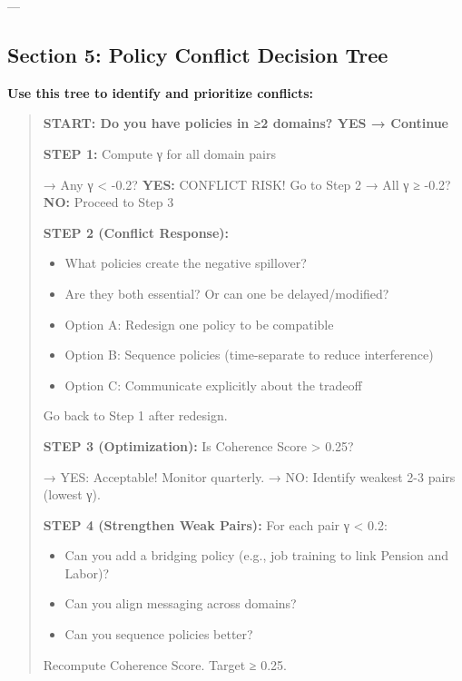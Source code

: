 ---


\subsection*{Section 5: Policy Conflict Decision Tree}

\textbf{Use this tree to identify and prioritize conflicts:}

\begin{quote}
\textbf{START: Do you have policies in ≥2 domains? YES → Continue}

\textbf{STEP 1:} Compute γ for all domain pairs

→ Any γ < -0.2? \textbf{YES:} CONFLICT RISK! Go to Step 2
→ All γ ≥ -0.2? \textbf{NO:} Proceed to Step 3

\textbf{STEP 2 (Conflict Response):}
\begin{itemize}[nosep]
\item What policies create the negative spillover?
\item Are they both essential? Or can one be delayed/modified?
\item Option A: Redesign one policy to be compatible
\item Option B: Sequence policies (time-separate to reduce interference)
\item Option C: Communicate explicitly about the tradeoff
\end{itemize}

Go back to Step 1 after redesign.

\textbf{STEP 3 (Optimization):} Is Coherence Score > 0.25?

→ YES: Acceptable! Monitor quarterly.
→ NO: Identify weakest 2-3 pairs (lowest γ).

\textbf{STEP 4 (Strengthen Weak Pairs):}
For each pair γ < 0.2:
\begin{itemize}[nosep]
\item Can you add a bridging policy (e.g., job training to link Pension and Labor)?
\item Can you align messaging across domains?
\item Can you sequence policies better?
\end{itemize}

Recompute Coherence Score. Target ≥ 0.25.
\end{quote}


